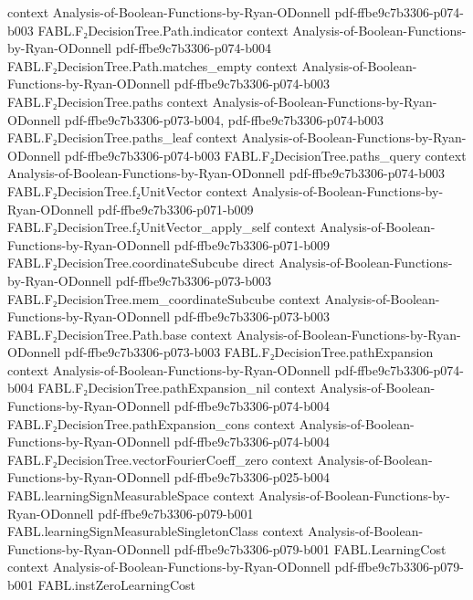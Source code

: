 \begin{theorem}
  {context}
  {Analysis-of-Boolean-Functions-by-Ryan-ODonnell}
  {pdf-ffbe9c7b3306-p074-b003}
\proofstep
  {FABL.F₂DecisionTree.Path.indicator}
  {context}
  {Analysis-of-Boolean-Functions-by-Ryan-ODonnell}
  {pdf-ffbe9c7b3306-p074-b004}
\proofstep
  {FABL.F₂DecisionTree.Path.matches_empty}
  {context}
  {Analysis-of-Boolean-Functions-by-Ryan-ODonnell}
  {pdf-ffbe9c7b3306-p074-b003}
\proofstep
  {FABL.F₂DecisionTree.paths}
  {context}
  {Analysis-of-Boolean-Functions-by-Ryan-ODonnell}
  {pdf-ffbe9c7b3306-p073-b004,
    pdf-ffbe9c7b3306-p074-b003}
\proofstep
  {FABL.F₂DecisionTree.paths_leaf}
  {context}
  {Analysis-of-Boolean-Functions-by-Ryan-ODonnell}
  {pdf-ffbe9c7b3306-p074-b003}
\proofstep
  {FABL.F₂DecisionTree.paths_query}
  {context}
  {Analysis-of-Boolean-Functions-by-Ryan-ODonnell}
  {pdf-ffbe9c7b3306-p074-b003}
\proofstep
  {FABL.F₂DecisionTree.f₂UnitVector}
  {context}
  {Analysis-of-Boolean-Functions-by-Ryan-ODonnell}
  {pdf-ffbe9c7b3306-p071-b009}
\proofstep
  {FABL.F₂DecisionTree.f₂UnitVector_apply_self}
  {context}
  {Analysis-of-Boolean-Functions-by-Ryan-ODonnell}
  {pdf-ffbe9c7b3306-p071-b009}
\proofstep
  {FABL.F₂DecisionTree.coordinateSubcube}
  {direct}
  {Analysis-of-Boolean-Functions-by-Ryan-ODonnell}
  {pdf-ffbe9c7b3306-p073-b003}
\proofstep
  {FABL.F₂DecisionTree.mem_coordinateSubcube}
  {context}
  {Analysis-of-Boolean-Functions-by-Ryan-ODonnell}
  {pdf-ffbe9c7b3306-p073-b003}
\proofstep
  {FABL.F₂DecisionTree.Path.base}
  {context}
  {Analysis-of-Boolean-Functions-by-Ryan-ODonnell}
  {pdf-ffbe9c7b3306-p073-b003}
\proofstep
  {FABL.F₂DecisionTree.pathExpansion}
  {context}
  {Analysis-of-Boolean-Functions-by-Ryan-ODonnell}
  {pdf-ffbe9c7b3306-p074-b004}
\proofstep
  {FABL.F₂DecisionTree.pathExpansion_nil}
  {context}
  {Analysis-of-Boolean-Functions-by-Ryan-ODonnell}
  {pdf-ffbe9c7b3306-p074-b004}
\proofstep
  {FABL.F₂DecisionTree.pathExpansion_cons}
  {context}
  {Analysis-of-Boolean-Functions-by-Ryan-ODonnell}
  {pdf-ffbe9c7b3306-p074-b004}
\proofstep
  {FABL.F₂DecisionTree.vectorFourierCoeff_zero}
  {context}
  {Analysis-of-Boolean-Functions-by-Ryan-ODonnell}
  {pdf-ffbe9c7b3306-p025-b004}
\proofstep
  {FABL.learningSignMeasurableSpace}
  {context}
  {Analysis-of-Boolean-Functions-by-Ryan-ODonnell}
  {pdf-ffbe9c7b3306-p079-b001}
\proofstep
  {FABL.learningSignMeasurableSingletonClass}
  {context}
  {Analysis-of-Boolean-Functions-by-Ryan-ODonnell}
  {pdf-ffbe9c7b3306-p079-b001}
\proofstep
  {FABL.LearningCost}
  {context}
  {Analysis-of-Boolean-Functions-by-Ryan-ODonnell}
  {pdf-ffbe9c7b3306-p079-b001}
\proofstep
  {FABL.instZeroLearningCost}

\end{theorem}
